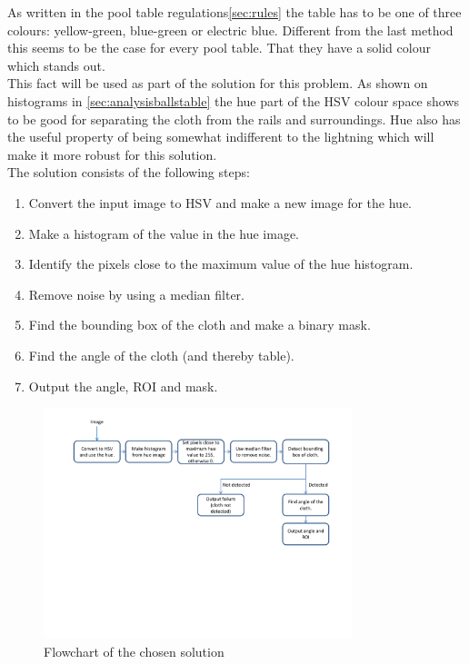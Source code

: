 As written in the pool table regulations\ref{sec:rules} the table has to be one of three colours: yellow-green, blue-green or electric blue. Different from the last method this seems to be the case for every pool table. That they have a solid colour which stands out.\\

This fact will be used as part of the solution for this problem. As shown on histograms in \ref{sec:analysisballstable} the hue part of the HSV colour space shows to be good for separating the cloth from the rails and surroundings. Hue also has the useful property of being somewhat indifferent to the lightning which will make it more robust for this solution.\\


The solution consists of the following steps:
\begin{enumerate}
\setlength{\itemsep}{0mm}
	\item Convert the input image to HSV and make a new image for the hue.
	\item Make a histogram of the value in the hue image.
	\item Identify the pixels close to the maximum value of the hue histogram.
	\item Remove noise by using a median filter.
	\item Find the bounding box of the cloth and make a binary mask.
	\item Find the angle of the cloth (and thereby table).
	\item Output the angle, ROI and mask.
\end{enumerate}

\begin{figure}[H]
\begin{center}
\leavevmode
\includegraphics[width=0.8\textwidth]{images/tabledetect_flowchart}
\end{center}
\caption{Flowchart of the chosen solution}
\label{fig:tabledetect_flowchart}
\end{figure}

